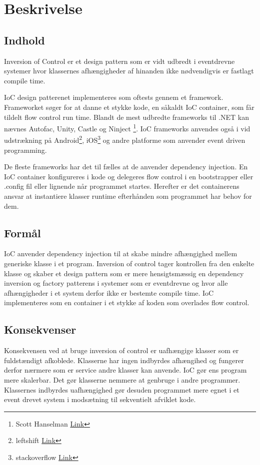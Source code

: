 \thispagestyle{fancy}
\chapter{Beskrivelse}
\label{chp:description}

\section{Indhold}
Inversion of Control er et design pattern som er vidt udbredt i eventdrevne systemer hvor klassernes afhængigheder af hinanden ikke nødvendigvis er fastlagt compile time. 

IoC design patterenet implementeres som oftests gennem et framework. Frameworket søger for at danne et stykke kode, en såkaldt IoC container, som får tildelt flow control run time. Blandt de mest udbredte frameworks til .NET kan nævnes Autofac, Unity, Castle og Ninject \footnote{Scott Hanselman \href{http://www.hanselman.com/blog/ListOfNETDependencyInjectionContainersIOC.aspx}{Link}}. IoC frameworks anvendes også i vid udstrækning på Android\footnote{leftshift \href{http://leftshift.io/android-inversion-of-control-dependency-injection-dagger-part-1}{Link}}, iOS\footnote{stackoverflow \href{http://stackoverflow.com/questions/8782398/recommended-ioc-framework-for-ios}{Link}} og andre platforme som anvender event driven programming.


De fleste frameworks har det til fælles at de anvender dependency injection. En IoC container konfigureres i kode og delegeres flow control i en bootstrapper eller .config fil eller lignende når programmet startes. Herefter er det containerens ansvar at instantiere klasser runtime efterhånden som programmet har behov for dem. 

\section{Formål}
IoC anvender dependency injection til at skabe mindre afhængighed mellem generiske klasse i et program. Inversion of control tager kontrollen fra den enkelte klasse og skaber et design pattern som er mere hensigtsmæssig en dependency inversion og factory patterens i systemer som er eventdrevne og hvor alle afhængigheder i et system derfor ikke er bestemte compile time. IoC implementeres som en container i et stykke af koden som overlades flow control.

\section{Konsekvenser}
Konsekvensen ved at bruge inversion of control er uafhængige klasser som er fuldstændigt afkoblede. Klasserne har ingen indbyrdes afhængihed og fungerer derfor nærmere som er service andre klasser kan anvende. IoC gør ens program mere skalerbar. Det gør klasserne nemmere at genbruge i andre programmer. Klassernes indbyrdes uafhængighed gør desuden programmet mere egnet i et event drevet system i modsætning til sekventielt afviklet kode.
